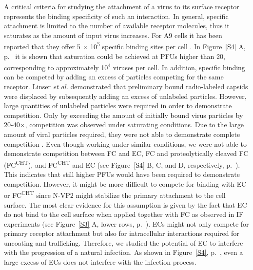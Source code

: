 A critical criteria for studying the attachment of a virus to its surface receptor represents the binding specificity of such an interaction. In general, specific attachment is limited to the number of available receptor molecules, thus it saturates as the amount of input virus increases. For A9 cells it has been reported that they offer 5 $\times$ 10\textsuperscript{5} specific binding sites per cell \cite{pmid20517}. In Figure~\ref{S4} A, p.~\pageref{S4} it is shown that saturation could be achieved at PFUs higher than 20, corresponding to approximately 10\textsuperscript{4} viruses per cell. In addition, specific binding can be competed by adding an excess of particles competing for the same receptor. Linser \textit{et al.} demonstrated that preliminary bound radio-labeled capsids were displaced by subsequently adding an excess of unlabeled particles. However, large quantities of unlabeled particles were required in order to demonstrate competition. Only by exceeding the amount of initially bound virus particles by 20-40$\times$, competition was observed under saturating conditions. Due to the large amount of viral particles required, they were not able to demonstrate complete competition \cite{pmid20517}. Even though working under similar conditions, we were not able to demonstrate competition between FC and EC, FC and proteolytically cleaved FC (FC\textsuperscript{CHT}), and FC\textsuperscript{CHT} and EC (see Figure~\ref{S4} B, C, and D, respectively, p.~\pageref{S4}). This indicates that still higher PFUs would have been required to demonstrate competition. However, it might be more difficult to compete for binding with EC or FC\textsuperscript{CHT} since N-VP2 might stabilize the primary attachment to the cell surface. The most clear evidence for this assumption is given by the fact that EC do not bind to the cell surface when applied together with FC as observed in IF experiments (see Figure~\ref{S3} A, lower rows, p.~\pageref{S3}). ECs might not only compete for primary receptor attachment but also for intracellular interactions required for uncoating and trafficking. Therefore, we studied the potential of EC to interfere with the progression of a natural infection. As shown in Figure~\ref{S4}, p.~\pageref{S4}, even a large excess of ECs does not interfere with the infection process. 

